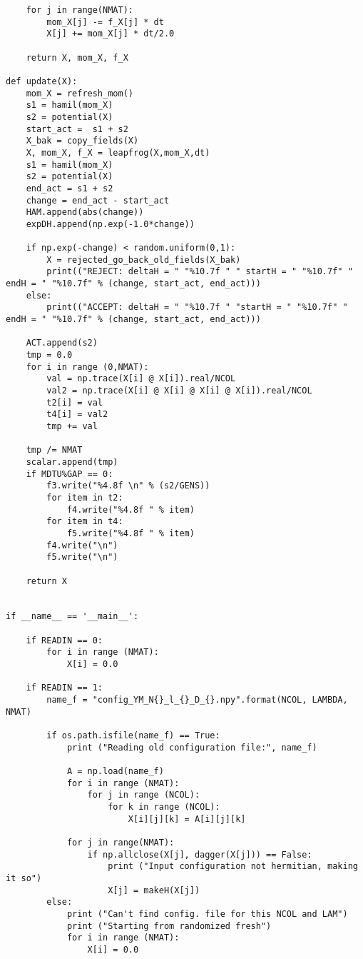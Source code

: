 \begin{lstlisting}
    for j in range(NMAT):
        mom_X[j] -= f_X[j] * dt
        X[j] += mom_X[j] * dt/2.0
    
    return X, mom_X, f_X

def update(X):
    mom_X = refresh_mom()
    s1 = hamil(mom_X)
    s2 = potential(X)
    start_act =  s1 + s2
    X_bak = copy_fields(X) 
    X, mom_X, f_X = leapfrog(X,mom_X,dt)
    s1 = hamil(mom_X)
    s2 = potential(X)
    end_act = s1 + s2
    change = end_act - start_act
    HAM.append(abs(change))
    expDH.append(np.exp(-1.0*change))   

    if np.exp(-change) < random.uniform(0,1):
        X = rejected_go_back_old_fields(X_bak)
        print(("REJECT: deltaH = " "%10.7f " " startH = " "%10.7f" " endH = " "%10.7f" % (change, start_act, end_act)))
    else:
        print(("ACCEPT: deltaH = " "%10.7f " "startH = " "%10.7f" " endH = " "%10.7f" % (change, start_act, end_act)))

    ACT.append(s2)
    tmp = 0.0 
    for i in range (0,NMAT):
        val = np.trace(X[i] @ X[i]).real/NCOL
        val2 = np.trace(X[i] @ X[i] @ X[i] @ X[i]).real/NCOL
        t2[i] = val 
        t4[i] = val2 
        tmp += val 

    tmp /= NMAT 
    scalar.append(tmp) 
    if MDTU%GAP == 0:
        f3.write("%4.8f \n" % (s2/GENS))
        for item in t2:
            f4.write("%4.8f " % item)
        for item in t4:
            f5.write("%4.8f " % item)
        f4.write("\n")
        f5.write("\n") 

    return X


if __name__ == '__main__':

    if READIN == 0:
        for i in range (NMAT):  
            X[i] = 0.0  

    if READIN == 1:
        name_f = "config_YM_N{}_l_{}_D_{}.npy".format(NCOL, LAMBDA, NMAT)

        if os.path.isfile(name_f) == True: 
            print ("Reading old configuration file:", name_f)
            
            A = np.load(name_f)
            for i in range (NMAT):
                for j in range (NCOL):
                    for k in range (NCOL):
                        X[i][j][k] = A[i][j][k] 

            for j in range(NMAT):
                if np.allclose(X[j], dagger(X[j])) == False:
                    print ("Input configuration not hermitian, making it so")
                    X[j] = makeH(X[j])
        else: 
            print ("Can't find config. file for this NCOL and LAM")
            print ("Starting from randomized fresh")
            for i in range (NMAT):  
                X[i] = 0.0


\end{lstlisting}
